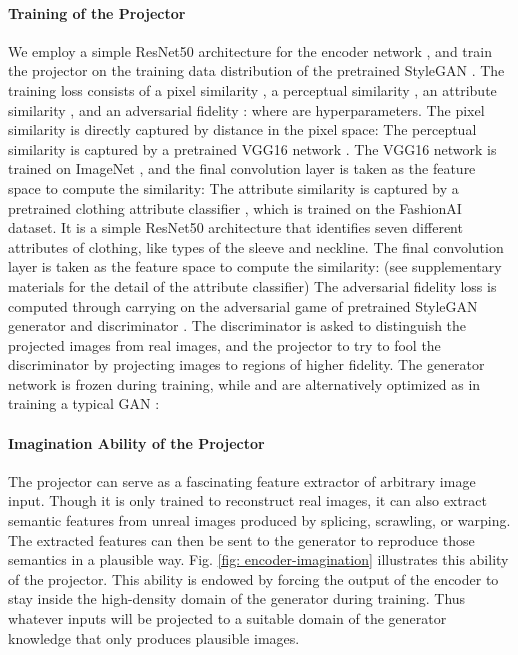 \documentclass[10pt,twocolumn,letterpaper]{article}
\begin{document}
\paragraph{Training of the Projector} We employ a simple ResNet50 \cite{he2016deep} architecture for the encoder network , and train the projector  on the training data distribution  of the pretrained StyleGAN . The training loss consists of a pixel similarity , a perceptual similarity , an attribute similarity , and an adversarial fidelity :
where  are hyperparameters.
The pixel similarity is directly captured by  distance in the pixel space:
The perceptual similarity is captured by a pretrained VGG16 network . The VGG16 \cite{simonyan2014very} network  is trained on ImageNet \cite{deng2009imagenet}, and the final convolution layer is taken as the feature space to compute the similarity:
The attribute similarity is captured by a pretrained clothing attribute classifier , which is trained on the FashionAI \cite{zou2019fashionai} dataset. It is a simple ResNet50 \cite{he2016deep} architecture that identifies seven different attributes of clothing, like types of the sleeve and neckline. The final convolution layer is taken as the feature space to compute the similarity: (see supplementary materials for the detail of the attribute classifier)
The adversarial fidelity loss is computed through carrying on the adversarial game of pretrained StyleGAN generator  and discriminator . The discriminator  is asked to distinguish the projected images  from real images, and the projector to try to fool the discriminator by projecting images to regions of higher fidelity. The generator network  is frozen during training, while  and  are alternatively optimized as in training a typical GAN \cite{goodfellow2014generative}:




\paragraph{Imagination Ability of the Projector} The projector can serve as a fascinating feature extractor of arbitrary image input. Though it is only trained to reconstruct real images, it can also extract semantic features from unreal images produced by splicing, scrawling, or warping. The extracted features can then be sent to the generator to reproduce those semantics in a plausible way. Fig. \ref{fig: encoder-imagination} illustrates this ability of the projector. This ability is endowed by forcing the output of the encoder to stay inside the high-density domain of the generator during training. Thus whatever inputs will be projected to a suitable domain of the generator knowledge that only produces plausible images.
\end{document}
